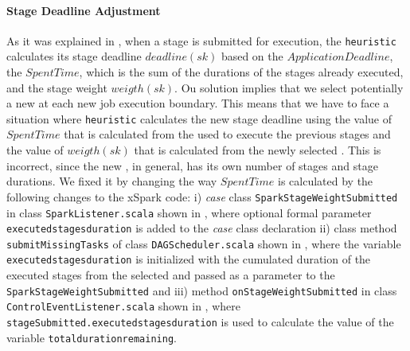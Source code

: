 \paragraph{Stage Deadline Adjustment}
As it was explained in , when a stage is submitted for execution, the \texttt{heuristic} calculates its stage deadline $deadline(sk)$ based on the   $ApplicationDeadline$, the $SpentTime$, which is the sum of the durations of the stages already executed, and the stage weight $weigth(sk)$. Ou solution implies that we select potentially a new \plan at each new job execution boundary. This means that we have to face a  situation where \texttt{heuristic} calculates the new stage deadline using the value of $SpentTime$ that is calculated from the \plan used to execute the previous stages and the value of $weigth(sk)$ that is calculated from the newly selected \plan. This is incorrect, since the new \plan, in general, has its own number of stages and stage durations. We fixed it by changing the way  $SpentTime$ is calculated by the following changes to the xSpark code: i) \textit{case} class \texttt{SparkStageWeightSubmitted} in class \texttt{SparkListener.scala} shown in , where optional formal parameter \texttt{executedstagesduration} is added to the \textit{case} class declaration ii) class method \texttt{submitMissingTasks} of class \texttt{DAGScheduler.scala} shown in , where the variable \texttt{executedstagesduration} is initialized with the cumulated duration of the executed stages from the selected \plan and passed as a parameter to the \texttt{SparkStageWeightSubmitted} and iii) method \texttt{onStageWeightSubmitted} in class \texttt{ControlEventListener.scala} shown in , where \texttt{stageSubmitted.executedstagesduration} is used to calculate the value of the variable \texttt{totaldurationremaining}. 





